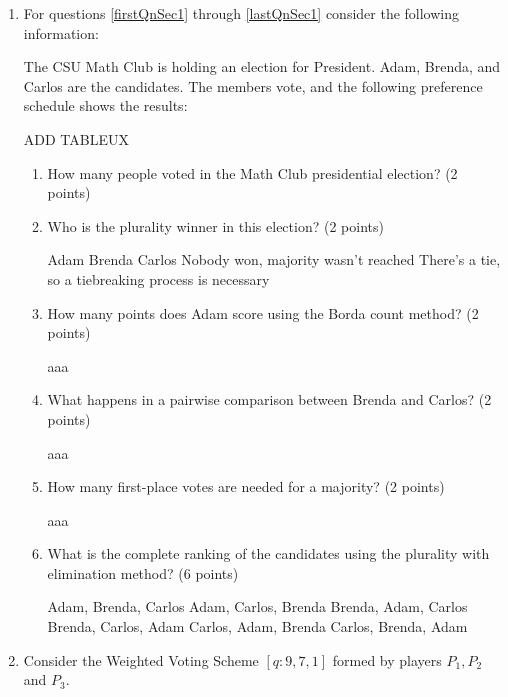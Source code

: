 \documentclass[12pt]{exam}
\begin{document}
\begin{enumerate} 

\item For questions \ref{firstQnSec1} through \ref{lastQnSec1} consider the following information:\par

The CSU Math Club is holding an election for President. Adam, Brenda, and Carlos are the candidates. The members vote, and the following preference schedule shows the results:

ADD TABLEUX
    

\begin{enumerate}
    \item \label{firstQnSec1} How many people voted in the Math Club presidential election? (2 points)
    \begin{checkboxes}
    \end{checkboxes}
    \vfill
    \item Who is the plurality winner in this election? (2 points)
    \begin{checkboxes}
        \choice Adam
        \choice Brenda
        \choice Carlos
        \choice Nobody won, majority wasn't reached
        \choice There's a tie, so a tiebreaking process is necessary 
    \end{checkboxes}
    \vfill
    \item How many points does Adam score using the Borda count method? (2 points)
    \begin{checkboxes}
        \choice aaa
    \end{checkboxes}
    \vfill
    \item What happens in a pairwise comparison between Brenda and Carlos? (2 points)
    \begin{checkboxes}
        \choice aaa
    \end{checkboxes}
    \vfill
    \item How many first-place votes are needed for a majority? (2 points)
    \begin{checkboxes}
        \choice aaa
    \end{checkboxes}
    \vfill
    \item \label{lastQnSec1} What is the complete ranking of the candidates using the plurality with elimination method? (6 points)
    \begin{checkboxes}
        \choice Adam, Brenda, Carlos
        \choice Adam, Carlos, Brenda
        \choice Brenda, Adam, Carlos
        \choice Brenda, Carlos, Adam
        \choice Carlos, Adam, Brenda
        \choice Carlos, Brenda, Adam
    \end{checkboxes}
    \vfill
\end{enumerate}
\item Consider the Weighted Voting Scheme $[q:9,7,1]$ formed by players $P_1, P_2$ and $P_3$.


\end{enumerate}
\end{document}
